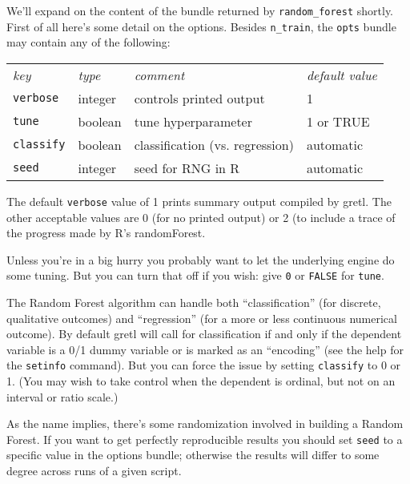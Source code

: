 \documentclass{article}
\begin{document}
We'll expand on the content of the bundle returned by
\texttt{random\_forest} shortly. First of all here's some detail on
the options. Besides \texttt{n\_train}, the \texttt{opts} bundle may
contain any of the following:

\begin{center}
\begin{tabular}{llll}
  \textit{key} & \textit{type} & \textit{comment} & \textit{default value} \\[4pt]
  \texttt{verbose} & integer & controls printed output & 1 \\
  \texttt{tune} & boolean & tune hyperparameter & 1 or TRUE \\
  \texttt{classify} & boolean & classification (vs. regression) & automatic\\
  \texttt{seed} & integer & seed for RNG in \textsf{R} & automatic
\end{tabular}
\end{center}

The default \texttt{verbose} value of 1 prints summary output compiled
by gretl. The other acceptable values are 0 (for no printed output) or
2 (to include a trace of the progress made by \textsf{R}'s
\textsf{randomForest}.

Unless you're in a big hurry you probably want to let the underlying
engine do some tuning. But you can turn that off if you wish: give
\texttt{0} or \texttt{FALSE} for \texttt{tune}.

The Random Forest algorithm can handle both ``classification'' (for
discrete, qualitative outcomes) and ``regression'' (for a more or less
continuous numerical outcome). By default gretl will call for
classification if and only if the dependent variable is a 0/1 dummy
variable or is marked as an ``encoding'' (see the help for the
\texttt{setinfo} command).  But you can force the issue by setting
\texttt{classify} to 0 or 1. (You may wish to take control when the
dependent is ordinal, but not on an interval or ratio scale.)

As the name implies, there's some randomization involved in building a
Random Forest. If you want to get perfectly reproducible results you
should set \texttt{seed} to a specific value in the options bundle;
otherwise the results will differ to some degree across runs of a
given script.
\end{document}
